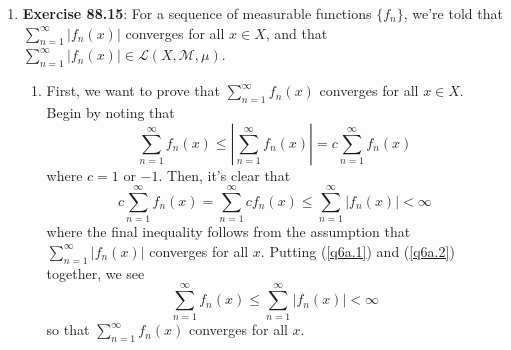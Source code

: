 \documentclass[12pt]{article}
\theoremstyle{plain}
\theoremstyle{definition}
\theoremstyle{remark}
\begin{document}
\begin{enumerate}
\newpage 
\item \textbf{Exercise 88.15}: For a sequence of measurable functions $\{f_n\}$, we're told that $\sum^\infty_{n=1} |f_n(x)|$ converges for all $x\in X$, and that $\sum^\infty_{n=1}|f_n(x)|\in\mathscr{L}(X,\mathscr{M},\mu)$. 
\begin{enumerate}
    \item First, we want to prove that $\sum^\infty_{n=1} f_n(x)$ converges for all $x\in X$. Begin by noting that 
\begin{equation}
    \label{q6a.1}
    \sum^\infty_{n=1} f_n(x) \leq 
    \left\lvert\sum^\infty_{n=1} f_n(x)\right\rvert =
    c \sum^\infty_{n=1} f_n(x)
\end{equation}
where $c=1$ or $-1$. Then, it's clear that 
\begin{equation}
    \label{q6a.2}
    c \sum^\infty_{n=1} f_n(x) =
    \sum^\infty_{n=1} c f_n(x) \leq
    \sum^\infty_{n=1} \left\lvert f_n(x) \right\rvert
    <\infty
\end{equation}
where the final inequality follows from the assumption that $\sum^\infty_{n=1} |f_n(x)|$ converges for all $x$. Putting (\ref{q6a.1}) and (\ref{q6a.2}) together, we see
\begin{equation}
    \sum^\infty_{n=1} f_n(x) \leq 
    \sum^\infty_{n=1} \left\lvert f_n(x) \right\rvert
    <\infty
\end{equation}
so that $\sum^\infty_{n=1} f_n(x)$ converges for all $x$.


\end{enumerate}
\end{enumerate}
\end{document}
